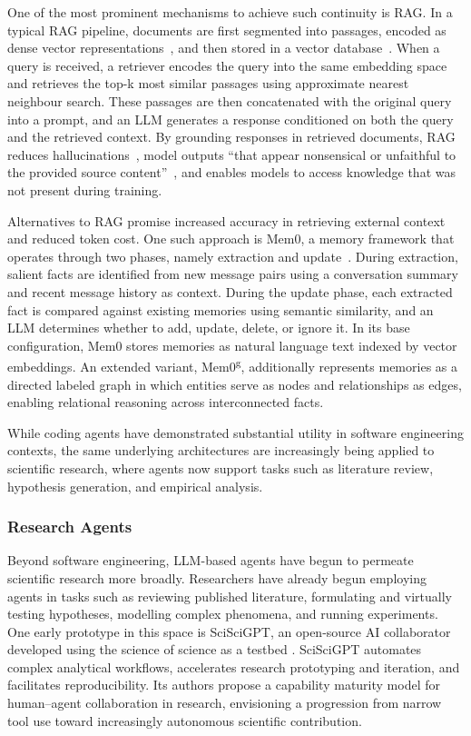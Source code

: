 \documentclass[
english,                 %
bibtex,                  %
includeExtraAbstracts, %
]{kththesis}
\numberwithin{listing}{chapter}
\begin{document}
One of the most prominent mechanisms to achieve such continuity is \gls{RAG}. In a typical \gls{RAG} pipeline, documents are first segmented into passages, encoded as dense vector representations~\cite{fan_survey_2024}, and then stored in a vector database~\cite{ramos_review_2025}. When a query is received, a retriever encodes the query into the same embedding space and retrieves the top-k most similar passages using approximate nearest neighbour search. These passages are then concatenated with the original query into a prompt, and an \gls{LLM} generates a response conditioned on both the query and the retrieved context. By grounding responses in retrieved documents, \gls{RAG} reduces hallucinations~\cite{shuster_retrieval_2021}, model outputs ``that appear nonsensical or unfaithful to the provided source content''~\cite{huang_survey_2025}, and enables models to access knowledge that was not present during training.

Alternatives to \gls{RAG} promise increased accuracy in retrieving external context and reduced token cost. One such approach is Mem0, a memory framework that operates through two phases, namely extraction and update~\cite{chhikara_mem0_2025}. During extraction, salient facts are identified from new message pairs using a conversation summary and recent message history as context. During the update phase, each extracted fact is compared against existing memories using semantic similarity, and an \gls{LLM} determines whether to add, update, delete, or ignore it. In its base configuration, Mem0 stores memories as natural language text indexed by vector embeddings. An extended variant, Mem0\textsuperscript{g}, additionally represents memories as a directed labeled graph in which entities serve as nodes and relationships as edges, enabling relational reasoning across interconnected facts.

While coding agents have demonstrated substantial utility in software engineering contexts, the same underlying architectures are increasingly being applied to scientific research, where agents now support tasks such as literature review, hypothesis generation, and empirical analysis.

\subsubsection{Research Agents}

Beyond software engineering, \gls{LLM}-based agents have begun to permeate scientific research more broadly. Researchers have already begun employing agents in tasks such as reviewing published literature, formulating and virtually testing hypotheses, modelling complex phenomena, and running experiments. One early prototype in this space is \gls{SciSciGPT}, an open-source AI collaborator developed using the science of science as a testbed \cite{shao_sciscigpt_2025}. \gls{SciSciGPT} automates complex analytical workflows, accelerates research prototyping and iteration, and facilitates reproducibility. Its authors propose a capability maturity model for human–agent collaboration in research, envisioning a progression from narrow tool use toward increasingly autonomous scientific contribution.
\end{document}
